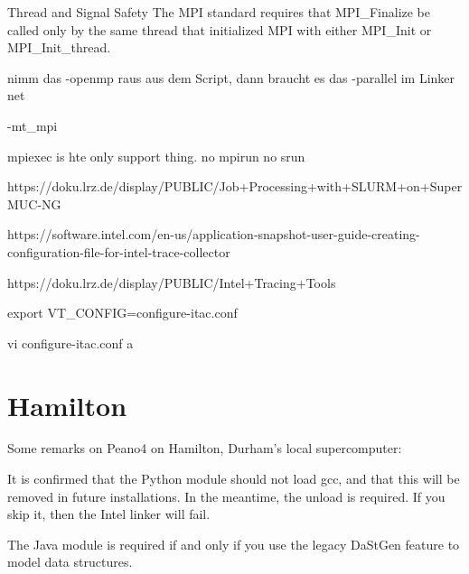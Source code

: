 Thread and Signal Safety
The MPI standard requires that MPI_Finalize be called only by the same thread that initialized MPI with either MPI_Init or MPI_Init_thread.


nimm das -openmp raus aus dem Script, dann braucht es das -parallel im Linker net

-mt_mpi


mpiexec is hte only support thing. no mpirun no srun

https://doku.lrz.de/display/PUBLIC/Job+Processing+with+SLURM+on+SuperMUC-NG




https://software.intel.com/en-us/application-snapshot-user-guide-creating-configuration-file-for-intel-trace-collector

https://doku.lrz.de/display/PUBLIC/Intel+Tracing+Tools%




export VT_CONFIG=configure-itac.conf



vi configure-itac.conf
a






\section{Hamilton}

Some remarks on Peano4 on Hamilton, Durham's local supercomputer:


\begin{remark}
 It is confirmed that the Python module should not load gcc, and that this will
 be removed in future installations.
 In the meantime, the unload is required.
 If you skip it, then the Intel linker will fail.
\end{remark}

\begin{remark}
The Java module is required if and only if you use the legacy DaStGen feature to
model data structures.
\end{remark}


